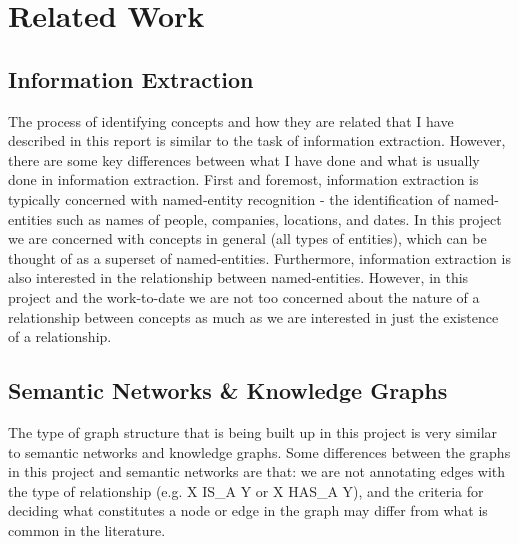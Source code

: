 \documentclass[12pt]{article}
\begin{document}
\section{Related Work} \label{sec:related_work}


\subsection{Information Extraction}
The process of identifying concepts and how they are related that I have described in this report is similar to the task of information extraction. However, there are some key differences between what I have done and what is usually done in information extraction. First and foremost, information extraction is typically concerned with named-entity recognition - the identification of named-entities such as names of people, companies, locations, and dates. In this project we are concerned with concepts in general (all types of entities), which can be thought of as a superset of named-entities. Furthermore, information extraction is also interested in the relationship between named-entities. However, in this project and the work-to-date we are not too concerned about the nature of a relationship between concepts as much as we are interested in just the existence of a relationship.

\subsection{Semantic Networks \& Knowledge Graphs}
The type of graph structure that is being built up in this project is very similar to semantic networks and knowledge graphs. Some differences between the graphs in this project and semantic networks are that: we are not annotating edges with the type of relationship (e.g. X IS\_A Y or X HAS\_A Y), and the criteria for deciding what constitutes a node or edge in the graph may differ from what is common in the literature. 
\end{document}
